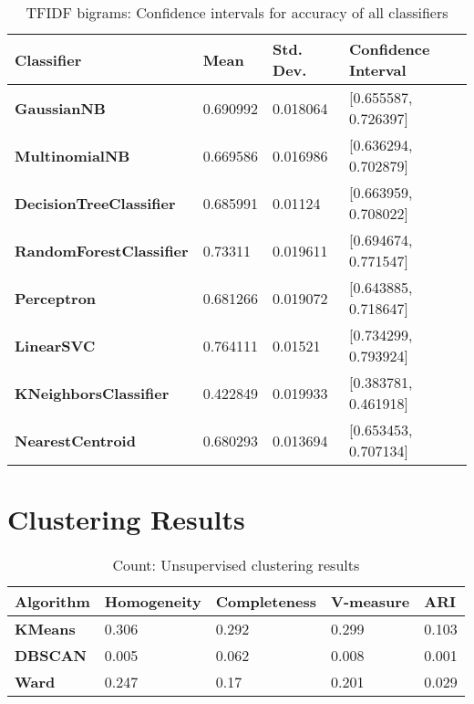 \documentclass{article}
\begin{document}
\begin{table}[h]
\begin{tabular}{l|lll}
\textbf{Classifier}             & \textbf{Mean} & \textbf{Std. Dev.} & \textbf{Confidence Interval} \\ \hline
\textbf{GaussianNB}             & 0.690992      & 0.018064           & {[}0.655587, 0.726397{]}     \\
\textbf{MultinomialNB}          & 0.669586      & 0.016986           & {[}0.636294, 0.702879{]}     \\
\textbf{DecisionTreeClassifier} & 0.685991      & 0.01124            & {[}0.663959, 0.708022{]}     \\
\textbf{RandomForestClassifier} & 0.73311       & 0.019611           & {[}0.694674, 0.771547{]}     \\
\textbf{Perceptron}             & 0.681266      & 0.019072           & {[}0.643885, 0.718647{]}     \\
\textbf{LinearSVC}              & 0.764111      & 0.01521            & {[}0.734299, 0.793924{]}     \\
\textbf{KNeighborsClassifier}   & 0.422849      & 0.019933           & {[}0.383781, 0.461918{]}     \\
\textbf{NearestCentroid}        & 0.680293      & 0.013694           & {[}0.653453, 0.707134{]}    
\end{tabular}
\caption {TFIDF bigrams: Confidence intervals for accuracy of all classifiers}
\end{table}

\clearpage
\section{Clustering Results}
\begin{table}[h]
\begin{tabular}{l|llll}
\textbf{Algorithm} & \textbf{Homogeneity} & \textbf{Completeness} & \textbf{V-measure} & \textbf{ARI} \\ \hline
\textbf{KMeans}    & 0.306                & 0.292                 & 0.299              & 0.103                        \\
\textbf{DBSCAN}    & 0.005                & 0.062                 & 0.008              & 0.001                        \\
\textbf{Ward}      & 0.247                & 0.17                  & 0.201              & 0.029                       
\end{tabular}
\caption{Count: Unsupervised clustering results}
\end{table}
\end{document}
